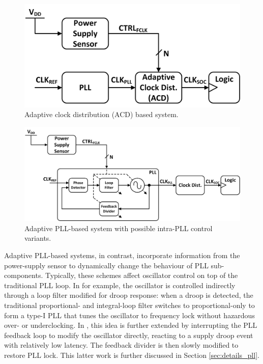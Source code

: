 \documentclass[twoside,9pt,journal,letterpage]{IEEEtran}
\begin{document}
\begin{figure}[h]
	\centering
	\includegraphics[width=0.7\columnwidth]{fig_overview_acd}
	\caption{Adaptive clock distribution (ACD) based system.}
	\label{fig:overview_acd}
\end{figure}

\begin{figure}[h]
	\centering
	\includegraphics[width=\columnwidth]{fig_overview_pll}
	\caption{Adaptive PLL-based system with possible intra-PLL control variants.}
	\label{fig:overview_pll}
\end{figure}

Adaptive PLL-based systems, in contrast, incorporate information from the power-supply sensor to dynamically change the behaviour of PLL sub-components. Typically, these schemes affect oscillator control on top of the traditional PLL loop. In \cite{ahmad2017} for example, the oscillator is controlled indirectly through a loop filter modified for droop response: when a droop is detected, the traditional proportional- and integral-loop filter switches to proportional-only to form a type-I PLL that tunes the oscillator to frequency lock without hazardous over- or underclocking. In \cite{hashimoto2018}, this idea is further extended by interrupting the PLL feedback loop to modify the oscillator directly, reacting to a supply droop event with relatively low latency. The feedback divider is then slowly modified to restore PLL lock. This latter work is further discussed in Section \ref{sec:details_pll}.
\end{document}
